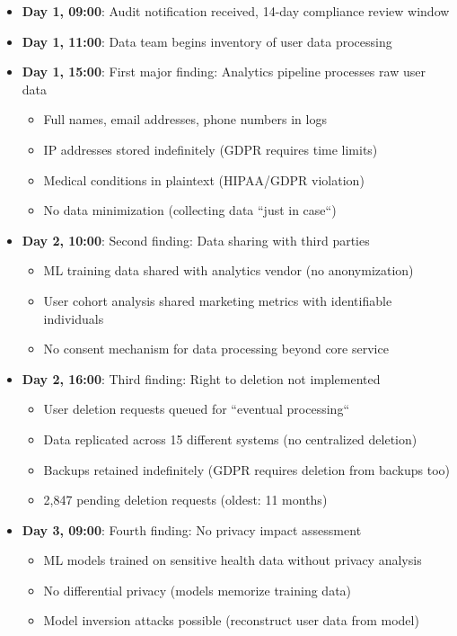 \begin{itemize}
    \item \textbf{Day 1, 09:00}: Audit notification received, 14-day compliance review window
    \item \textbf{Day 1, 11:00}: Data team begins inventory of user data processing
    \item \textbf{Day 1, 15:00}: First major finding: Analytics pipeline processes raw user data
    \begin{itemize}
        \item Full names, email addresses, phone numbers in logs
        \item IP addresses stored indefinitely (GDPR requires time limits)
        \item Medical conditions in plaintext (HIPAA/GDPR violation)
        \item No data minimization (collecting data ``just in case``)
    \end{itemize}
    \item \textbf{Day 2, 10:00}: Second finding: Data sharing with third parties
    \begin{itemize}
        \item ML training data shared with analytics vendor (no anonymization)
        \item User cohort analysis shared marketing metrics with identifiable individuals
        \item No consent mechanism for data processing beyond core service
    \end{itemize}
    \item \textbf{Day 2, 16:00}: Third finding: Right to deletion not implemented
    \begin{itemize}
        \item User deletion requests queued for ``eventual processing``
        \item Data replicated across 15 different systems (no centralized deletion)
        \item Backups retained indefinitely (GDPR requires deletion from backups too)
        \item 2,847 pending deletion requests (oldest: 11 months)
    \end{itemize}
    \item \textbf{Day 3, 09:00}: Fourth finding: No privacy impact assessment
    \begin{itemize}
        \item ML models trained on sensitive health data without privacy analysis
        \item No differential privacy (models memorize training data)
        \item Model inversion attacks possible (reconstruct user data from model)
    \end{itemize}
\end{itemize}

